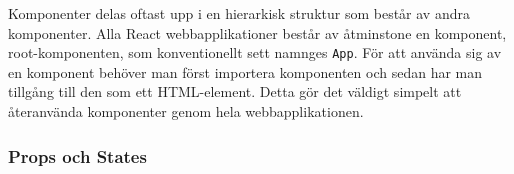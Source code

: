 Komponenter delas oftast upp i en hierarkisk struktur som består av andra komponenter. Alla React webbapplikationer består av åtminstone en komponent, root-komponenten, som konventionellt sett namnges \texttt{App}. För att använda sig av en komponent behöver man först importera komponenten och sedan har man tillgång till den som ett HTML-element. Detta gör det väldigt simpelt att återanvända komponenter genom hela webbapplikationen.


\subsubsection{Props och States} 



